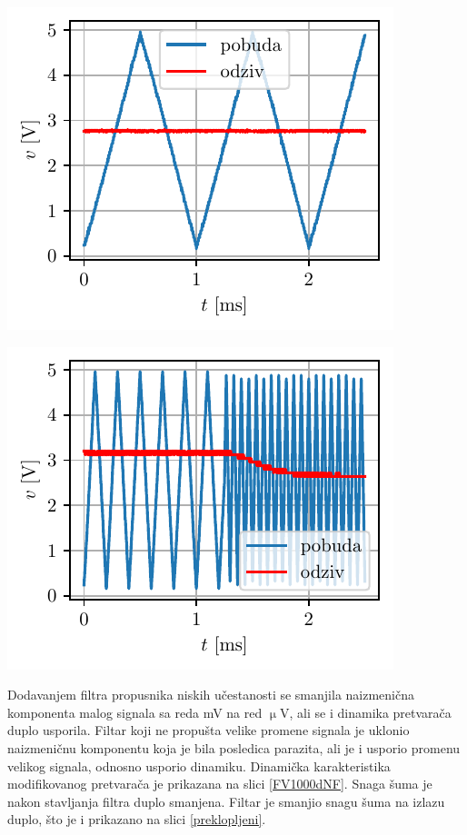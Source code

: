 \documentclass[a4paper, 12pt, diplomski]{etf}
\begin{document}
\begin{center}
\begin{minipage}{0.45\textwidth}
\centering
\includegraphics[scale=1]{fig_osc/FV1000sNF.pdf}
\label{FV1000sNF}
\end{minipage}\hfill
\begin{minipage}{0.45\textwidth}
\includegraphics[scale=1]{fig_osc/FV1000dNF.pdf} 
\label{FV1000dNF} 
\end{minipage}
\end{center}


Dodavanjem filtra propusnika niskih učestanosti se smanjila naizmenična komponenta malog signala sa reda mV na red $\upmu$V, ali se i dinamika pretvarača duplo usporila. Filtar koji ne propušta velike promene signala je uklonio naizmeničnu komponentu koja je bila posledica parazita, ali je i usporio promenu velikog signala, odnosno usporio dinamiku. Dinamička karakteristika modifikovanog pretvarača je prikazana na slici \ref{FV1000dNF}. Snaga šuma je nakon stavljanja filtra duplo smanjena. Filtar je smanjio snagu šuma na izlazu duplo, što je i prikazano na slici \ref{preklopljeni}.
\end{document}
